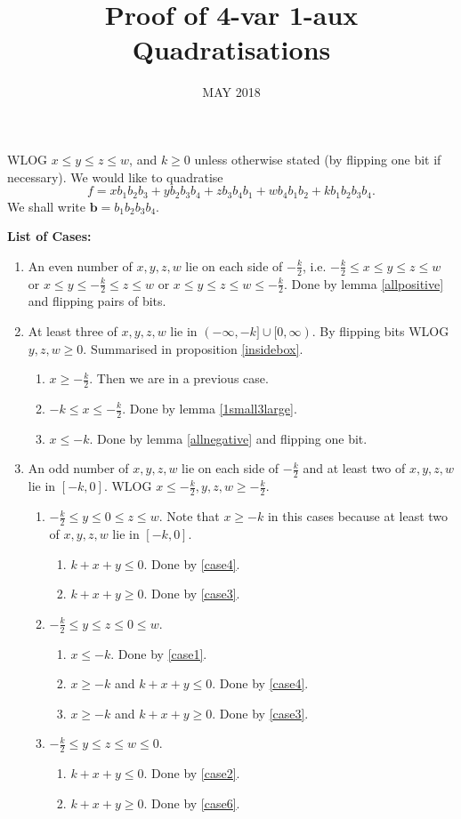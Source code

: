 \documentclass[11pt]{scrartcl}
\newcommand{\vc}[1]{\boldsymbol{#1}}
\begin{document}
\title{Proof of 4-var 1-aux Quadratisations} \date{MAY 2018}

WLOG $x \le y \le z \le w$, and  $k \ge 0$ unless otherwise stated (by flipping one bit if necessary). We would like to quadratise 
\[f = x b_1 b_2 b_3 + y b_2 b_3 b_4 + z b_3 b_4 b_1 + w b_4 b_1 b_2 + k b_1 b_2 b_3 b_4.\] We shall write $\vc b = b_1 b_2 b_3 b_4$.


{\LARGE \textbf{ List of Cases:}}
\begin{enumerate}
	\item An even number of $x, y, z, w$ lie on each side of $-\frac{k}{2}$, i.e. 
		$-\frac{k}{2} \le x \le y \le z \le w$ or $x \le y \le -\frac{k}{2} \le z \le w$ or 
		$x \le y \le z \le w \le -\frac{k}{2}$.
		Done by lemma \ref{allpositive} and flipping pairs of bits.
	\item At least three of $x, y, z, w$ lie in $(-\infty, -k] \cup [0, \infty)$. 
			By flipping bits WLOG $y, z, w \ge 0$. Summarised in proposition \ref{insidebox}.
		\begin{enumerate}
			\item $x \ge -\frac{k}{2}$. Then we are in a previous case.
			\item $-k \le x \le -\frac{k}{2}$. Done by lemma \ref{1small3large}.
			\item $x \le -k$. Done by lemma \ref{allnegative} and flipping one bit.
		\end{enumerate}
	\item An odd number of $x, y, z, w$ lie on each side of $-\frac{k}{2}$ and at least two of $x, y, z, w$ lie in $[-k, 0]$. 
		WLOG $x \le -\frac{k}{2}, y, z, w \ge -\frac{k}{2}$.
		\begin{enumerate}
			\item $-\frac{k}{2} \le y \le 0 \le z \le w$. Note that $x \ge -k$ in this cases 
				because at least two of $x, y, z, w$ lie in $[-k, 0]$.
				\begin{enumerate}
					\item $k+x+y \le 0$. Done by \ref{case4}.
					\item $k+x+y \ge 0$. Done by \ref{case3}.
				\end{enumerate}
			\item $-\frac{k}{2} \le y \le z \le 0 \le w$.
				\begin{enumerate}
					\item $x \le -k$. Done by \ref{case1}.
					\item $x \ge -k$ and $k+x+y \le 0$. Done by \ref{case4}.
					\item $x \ge -k$ and $k+x+y \ge 0$. Done by \ref{case3}.
				\end{enumerate}
			\item $-\frac{k}{2} \le y \le z \le w \le 0$.
				\begin{enumerate}
					\item $k+x+y \le 0$. Done by \ref{case2}.
					\item $k+x+y \ge 0$. Done by \ref{case6}.
				\end{enumerate}
		\end{enumerate}
\end{enumerate}
\end{document}
